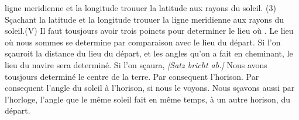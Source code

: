 ligne meridienne et la longitude\protect{} trouuer la latitude\protect{} aux rayons du soleil. (3) S\c{c}achant la latitude\protect{} et la longitude\protect{} trouuer la ligne meridienne aux rayons du soleil.\pend \pstart (V) Il faut tousjours avoir trois poincts pour determiner le lieu o\`{u} . Le lieu o\`{u} nous sommes se determine par comparaison avec le lieu du d\'{e}part. Si l'on s\c{c}auroit la distance du lieu du d\'{e}part, et les angles qu'on a fait en cheminant, le lieu du navire\protect{} sera determin\'{e}. Si l'on s\c{c}aura,  \textit{[Satz bricht ab.]} \pend \pstart Nous avons tousjours determin\'{e} le centre de la terre. Par consequent l'horison. Par consequent l'angle du soleil \`{a} l'horison, si nous le voyons. Nous s\c{c}avons aussi par l'horloge\protect{}, l'angle que le même soleil fait en même temps, \`{a} un autre horison, du d\'{e}part.\pend 